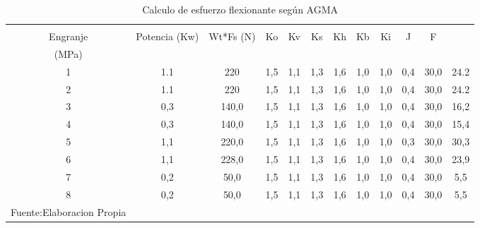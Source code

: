 \begin{longtable}{|c|c|c|c|c|c|c|c|c|c|c|c|}
\hline
\begin{tabular}[c]{@{}c@{}}N°\\ Engranje\end{tabular} & Potencia (Kw) & Wt*Fs (N) & Ko  & Kv  & Ks  & Kh  & Kb  & Ki  & J   & F    & \begin{tabular}[c]{@{}c@{}}Esfuerzo AGMA \\   (MPa)\end{tabular} \\ \hline
1                                                     & 1.1           & 220      & 1,5 & 1,1 & 1,3 & 1,6 & 1,0 & 1,0 & 0,4 & 30,0 & 24.2                                                              \\ \hline
2                                                     & 1.1           & 220      & 1,5 & 1,1 & 1,3 & 1,6 & 1,0 & 1,0 & 0,4 & 30,0 & 24.2                                                              \\ \hline
3                                                     & 0,3           & 140,0     & 1,5 & 1,1 & 1,3 & 1,6 & 1,0 & 1,0 & 0,4 & 30,0 & 16,2                                                             \\ \hline
4                                                     & 0,3           & 140,0     & 1,5 & 1,1 & 1,3 & 1,6 & 1,0 & 1,0 & 0,4 & 30,0 & 15,4                                                             \\ \hline
5                                                     & 1,1           & 220,0     & 1,5 & 1,1 & 1,3 & 1,6 & 1,0 & 1,0 & 0,3 & 30,0 & 30,3                                                             \\ \hline
6                                                     & 1,1           & 228,0     & 1,5 & 1,1 & 1,3 & 1,6 & 1,0 & 1,0 & 0,4 & 30,0 & 23,9                                                             \\ \hline
7                                                     & 0,2           & 50,0      & 1,5 & 1,1 & 1,3 & 1,6 & 1,0 & 1,0 & 0,4 & 30,0 & 5,5                                                              \\ \hline
8                                                     & 0,2           & 50,0      & 1,5 & 1,1 & 1,3 & 1,6 & 1,0 & 1,0 & 0,4 & 30,0 & 5,5                                                              \\ \hline

\caption{Calculo de esfuerzo flexionante según AGMA}{Fuente:Elaboracion Propia}
\label{table:fatiga_flexionante}
\end{longtable}

